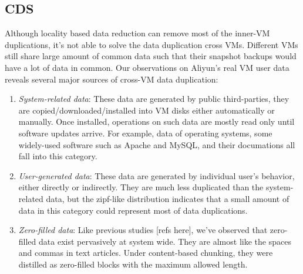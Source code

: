 

\subsection{CDS}
Although locality based data reduction can remove most of the inner-VM duplications,
it's not able to solve the data duplication cross VMs. Different VMs still share large amount
of common data such that their snapshot backups would have a lot of data in common.
Our observations on Aliyun's real VM user data reveals several major sources of cross-VM data duplication:
  \begin{enumerate}
  \item \emph{System-related data}: These data are generated by public third-parties, they are copied/downloaded/installed into VM disks either automatically or manually. Once installed, operations on such data are mostly read only until software updates arrive. For example, data of operating systems, some widely-used software such as Apache and MySQL, and their documations all fall into this category.
  \item \emph{User-generated data}: These data are generated by individual user's behavior, either directly or indirectly. They are much less duplicated than the system-related data, but the zipf-like distribution indicates that a small amount of data in this category could represent most of data duplications.
  \item \emph{Zero-filled data}: Like previous studies [refs here], we've observed that zero-filled data exist pervasively at system wide. They are almost like the spaces and commas in text articles. Under content-based chunking, they were distilled as zero-filled blocks with the maximum allowed length. 
  \end{enumerate}

